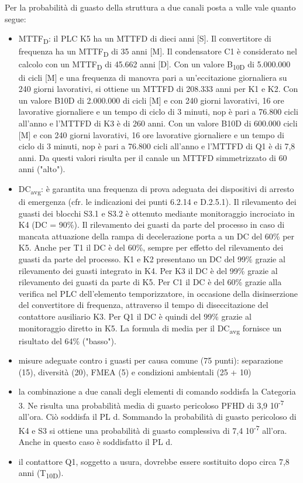 Per la probabilità di guasto della struttura a due canali posta a valle vale quanto segue:
\begin{itemize}
    \item MTTF\textsubscript{D}: il PLC K5 ha un MTTFD di dieci anni [S]. Il convertitore di frequenza ha un MTTF\textsubscript{D} di 35 anni [M]. Il condensatore C1 è considerato nel calcolo con un MTTF\textsubscript{D} di 45.662 anni [D]. Con un valore B\textsubscript{10D} di 5.000.000 di cicli [M] e una frequenza di manovra pari a un'eccitazione giornaliera su 240 giorni lavorativi, si ottiene un MTTFD di 208.333 anni per K1 e K2. Con un valore B10D di 2.000.000 di cicli [M] e con 240 giorni lavorativi, 16 ore lavorative giornaliere e un tempo di ciclo di 3 minuti, nop è pari a 76.800 cicli all'anno e l'MTTFD di K3 è di 260 anni. Con un valore B10D di 600.000 cicli [M] e con 240 giorni lavorativi, 16 ore lavorative giornaliere e un tempo di ciclo di 3 minuti, nop è pari a 76.800 cicli all'anno e l'MTTFD di Q1 è di 7,8 anni. Da questi valori risulta per il canale un MTTFD simmetrizzato di 60 anni ("alto").
    \item DC\textsubscript{avg}: è garantita una frequenza di prova adeguata dei dispositivi di arresto di emergenza (cfr. le indicazioni dei punti 6.2.14 e D.2.5.1). Il rilevamento dei guasti dei blocchi S3.1 e S3.2 è ottenuto mediante monitoraggio incrociato in K4 (DC = 90\%). Il rilevamento dei guasti da parte del processo in caso di mancata attuazione della rampa di decelerazione porta a un DC del 60\% per K5. Anche per T1 il DC è del 60\%, sempre per effetto del rilevamento dei guasti da parte del processo. K1 e K2 presentano un DC del 99\% grazie al rilevamento dei guasti integrato in K4. Per K3 il DC è del 99\% grazie al rilevamento dei guasti da parte di K5. Per C1 il DC è del 60\% grazie alla verifica nel PLC dell'elemento temporizzatore, in occasione della disinserzione del convertitore di frequenza, attraverso il tempo di diseccitazione del contattore ausiliario K3. Per Q1 il DC è quindi del 99\% grazie al monitoraggio diretto in K5. La formula di media per il DC\textsubscript{avg} fornisce un risultato del 64\% ("basso").
    \item misure adeguate contro i guasti per causa comune (75 punti): separazione (15), diversità (20), FMEA (5) e condizioni ambientali (25 + 10)
    \item la combinazione a due canali degli elementi di comando soddisfa la Categoria 3. Ne risulta una probabilità media di guasto pericoloso PFHD di 3,9 10\textsuperscript{-7} all'ora. Ciò soddisfa il PL d. Sommando la probabilità di guasto pericoloso di K4 e S3 si ottiene una probabilità di guasto complessiva di 7,4 10\textsuperscript{-7} all'ora. Anche in questo caso è soddisfatto il PL d.
    \item il contattore Q1, soggetto a usura, dovrebbe essere sostituito dopo circa 7,8 anni (T\textsubscript{10D}).
\end{itemize}
\clearpage

